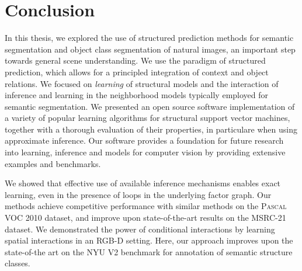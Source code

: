 \documentclass[12pt,toc=bibnumbered, a4paper,twoside,DIV=11,BCOR=1cm]{scrbook}
\begin{document}
\chapter{Conclusion}
In this thesis, we explored the use of structured prediction methods for semantic
segmentation and object class segmentation of natural images, an important
step towards general scene understanding.
We use the paradigm of structured prediction, which allows for a principled
integration of context and object relations.
We focused on \emph{learning} of structural models and the interaction of
inference and learning in the neighborhood models typically employed for
semantic segmentation.
We presented an open source software implementation of a variety of
popular learning algorithms for structural support vector machines, together
with a thorough evaluation of their properties, in particulare when using approximate
inference. Our software provides a foundation for future research into learning,
inference and models for computer vision by providing extensive examples and
benchmarks.

We showed that effective use of available inference mechanisms enables
exact learning, even in the presence of loops in the underlying
factor graph. Our methods achieve competitive performance with similar
methods on the \textsc{Pascal} VOC 2010 dataset, and improve upon state-of-the-art
 results on the MSRC-21 dataset.
We demonstrated the power of conditional interactions by learning spatial
interactions in an RGB-D setting. Here, our approach improves upon the state-of-the
art on the NYU V2 benchmark for annotation of semantic structure classes.
\end{document}
